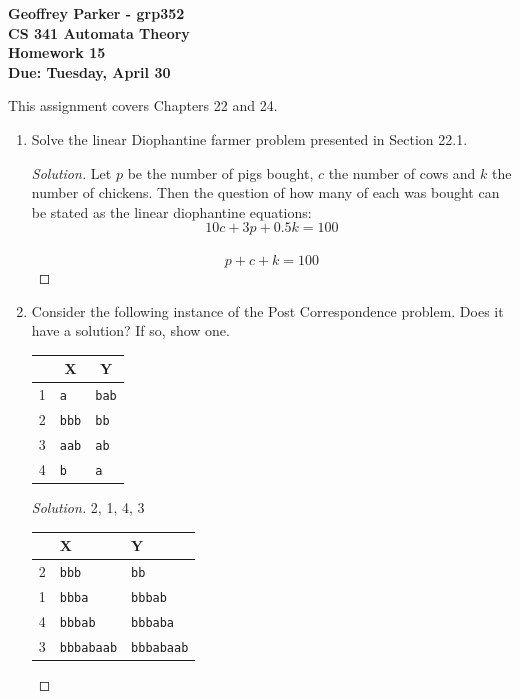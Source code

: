 \documentclass[10pt]{article}
\begin{document}
\begin{flushleft}
\textbf{\noindent
Geoffrey Parker - grp352\\
CS 341 Automata Theory \\
Homework 15 \\
Due: Tuesday, April 30}\\
\end{flushleft}

\noindent
This assignment covers Chapters 22 and 24.\\

\begin{enumerate}[1)]


\item
Solve the linear Diophantine farmer problem presented in Section 22.1.
\begin{proof}[Solution]
Let $p$ be the number of pigs bought, $c$ the number of cows and $k$ the number of chickens.  Then the question of how many of each was bought can be stated as the linear diophantine equations:
\[10c + 3p + 0.5k = 100\]\\
\[p + c + k = 100\]
\end{proof}


\item
Consider the following instance of the Post Correspondence problem.  Does it have a solution?  If so, show one.\\
\begin{center}
\begin{tabular}{| p{1cm} | p{3cm} | p{3cm} |}
  \hline
  \multicolumn{1}{|c}{}&
  \multicolumn{1}{|c|}{X}&
  \multicolumn{1}{c|}{Y}\\
  \hline
  1&\texttt{a}&\texttt{bab}\\
  \hline
  2&\texttt{bbb}&\texttt{bb}\\
  \hline
  3&\texttt{aab}&\texttt{ab}\\
  \hline
  4&\texttt{b}&\texttt{a}\\
  \hline
\end{tabular}
\end{center}
\begin{proof}[Solution]
2, 1, 4, 3\\

\begin{tabular}{l l | l}
&X&Y\\
\hline
2&\texttt{bbb}&\texttt{bb}\\
1&\texttt{bbba}&\texttt{bbbab}\\
4&\texttt{bbbab}&\texttt{bbbaba}\\
3&\texttt{bbbabaab}&\texttt{bbbabaab}\\
\end{tabular}
\end{proof}


\end{enumerate}
\end{document}
